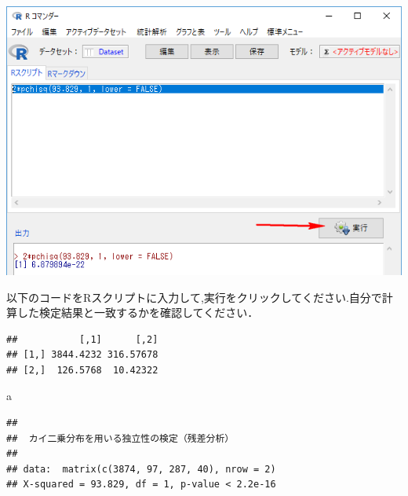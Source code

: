 \documentclass[11pt,]{problemset}
\newenvironment{Shaded}{\begin{snugshade}}{\end{snugshade}}
\newcommand{\CommentTok}[1]{\textcolor[rgb]{0.56,0.35,0.01}{\textit{#1}}}
\newcommand{\DataTypeTok}[1]{\textcolor[rgb]{0.13,0.29,0.53}{#1}}
\newcommand{\DecValTok}[1]{\textcolor[rgb]{0.00,0.00,0.81}{#1}}
\newcommand{\KeywordTok}[1]{\textcolor[rgb]{0.13,0.29,0.53}{\textbf{#1}}}
\newcommand{\NormalTok}[1]{#1}
\newcommand{\OperatorTok}[1]{\textcolor[rgb]{0.81,0.36,0.00}{\textbf{#1}}}
\newcommand{\StringTok}[1]{\textcolor[rgb]{0.31,0.60,0.02}{#1}}
\begin{document}
\begin{center}\includegraphics[width=0.7\linewidth]{pic/mychisqtest02} \end{center}

以下のコードをRスクリプトに入力して,実行をクリックしてください.自分で計算した検定結果と一致するかを確認してください．

\begin{Shaded}
\end{Shaded}

\begin{verbatim}
##           [,1]      [,2]
## [1,] 3844.4232 316.57678
## [2,]  126.5768  10.42322
\end{verbatim}

\begin{Shaded}
\begin{Highlighting}[]
\NormalTok{a}
\end{Highlighting}
\end{Shaded}

\begin{verbatim}
## 
##  カイ二乗分布を用いる独立性の検定（残差分析）
## 
## data:  matrix(c(3874, 97, 287, 40), nrow = 2)
## X-squared = 93.829, df = 1, p-value < 2.2e-16
\end{verbatim}
\end{document}
